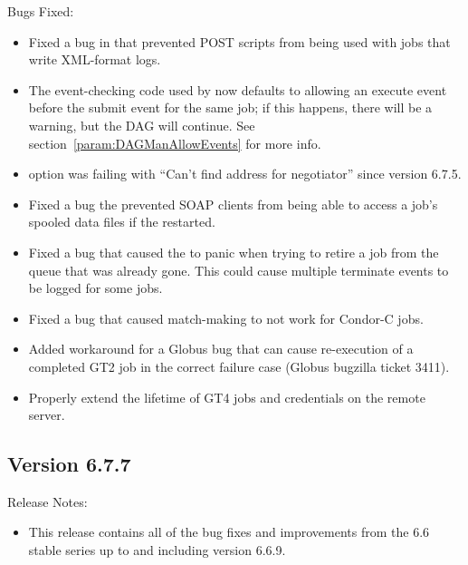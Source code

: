 \noindent Bugs Fixed:

\begin{itemize}

\item Fixed a bug in  that prevented POST scripts
from being used with jobs that write XML-format logs.

\item The event-checking code used by  now defaults
to allowing an execute event before the submit event for the same
job; if this happens, there will be a warning, but the DAG will
continue.  See section~\ref{param:DAGManAllowEvents} for more info.

\item {} option  was failing with ``Can't
find address for negotiator'' since version 6.7.5.

\item Fixed a bug the prevented SOAP clients from being able to access
a job's spooled data files if the  restarted.

\item Fixed a bug that caused the  to panic when
trying to retire a job from the queue that was already gone. This
could cause multiple terminate events to be logged for some jobs.

\item Fixed a bug that caused match-making to not work for Condor-C
jobs.

\item Added workaround for a Globus bug that can cause re-execution of
a completed GT2 job in the correct failure case (Globus bugzilla ticket
3411).

\item Properly extend the lifetime of GT4 jobs and credentials on the
remote server.

\end{itemize}

\subsection*{\label{sec:New-6-7-7}Version 6.7.7}

\noindent Release Notes:

\begin{itemize}

\item This release contains all of the bug fixes and improvements from
  the 6.6 stable series up to and including version 6.6.9.

\end{itemize}

